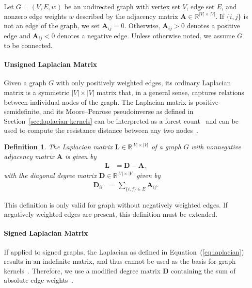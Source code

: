 \documentclass[11pt,a4paper]{book}
\newtheorem{mydef}{Definition}
\begin{document}
Let $G = (V, E, w)$ be an undirected graph with vertex set $V$, edge set
$E$, and nonzero edge weights $w$ described by the adjacency matrix $\mathbf
A \in
\mathbb{R}^{|V| \times |V|}$.  
If $\{i,j\}$ is not an edge of the graph, we set $\mathbf A_{ij} = 0$.
Otherwise, $\mathbf A_{ij}>0$ denotes a positive edge and $\mathbf
A_{ij}<0$ denotes a 
negative edge.  Unless otherwise noted, we assume $G$ to be connected.

\paragraph{Unsigned Laplacian Matrix}
Given a graph $G$ with only positively weighted edges, its ordinary
Laplacian matrix is a symmetric $|V| \times |V|$ matrix that, in a general
sense, captures relations between individual nodes of the graph.
The Laplacian matrix is positive-semidefinite, and its Moore--Penrose
pseudoinverse as defined in Section~\ref{sec:laplacian-kernels} can be
interpreted as a forest count~\cite{b191} and 
can be used to compute the
resistance distance between any two nodes~\cite{b101}.  

\begin{mydef}
  The Laplacian matrix $\mathbf L \in \mathbb{R}^{|V| \times |V|}$ 
  of a graph $G$ with nonnegative adjacency matrix $\mathbf A$
  is given by 
  \begin{align}
    \mathbf L &= \mathbf D - \mathbf A, \label{eq:laplacian}
  \end{align}
  with the diagonal degree matrix $\mathbf D \in \mathbb R^{|V| \times
    |V|}$ given by  
  \begin{align}
    \mathbf D_{ii} &= \sum_{\{i,j\}\in E} \mathbf A_{ij}.
  \end{align}
\end{mydef}

This definition is only valid for graph without negatively weighted
edges.  If negatively weighted edges are present, this definition must
be extended. 

\paragraph{Signed Laplacian Matrix}
If applied to signed graphs, the Laplacian as defined in 
Equation~(\ref{eq:laplacian}) results in an indefinite matrix, and thus
cannot be used as the basis for graph kernels~\cite{b365}. 
Therefore, we use a modified degree matrix $\mathbf D$ containing the
sum of absolute edge weights~\cite{b351}.  
\end{document}
